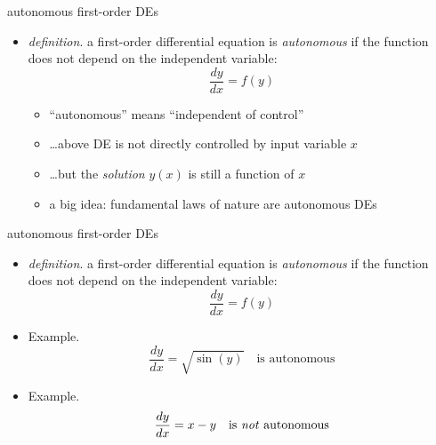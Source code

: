 \documentclass[colorlinks]{beamer}
\begin{document}
\begin{frame}{autonomous first-order DEs}

\begin{itemize}
\item \emph{definition}. a first-order differential equation is \emph{autonomous} if the function does not depend on the independent variable:
    $$\frac{dy}{dx} = f(y)$$

\bigskip
    \begin{itemize}
    \item ``autonomous'' means ``independent of control''
    \item \dots above DE is not directly controlled by input variable $x$
    \item \dots but the \emph{solution} $y(x)$ is still a function of $x$
    \item a big idea: fundamental laws of nature are autonomous DEs
    \end{itemize}
\end{itemize}
\end{frame}


\begin{frame}{autonomous first-order DEs}

\begin{itemize}
\item \emph{definition}. a first-order differential equation is \emph{autonomous} if the function does not depend on the independent variable:
    $$\frac{dy}{dx} = f(y)$$

\bigskip
\item Example.
    $$\frac{dy}{dx} = \sqrt{\sin(y)} \quad \text{is autonomous}$$
\item Example.
    $$\frac{dy}{dx} = x-y \quad \text{is \emph{not} autonomous}$$
\end{itemize}
\end{frame}
\end{document}
